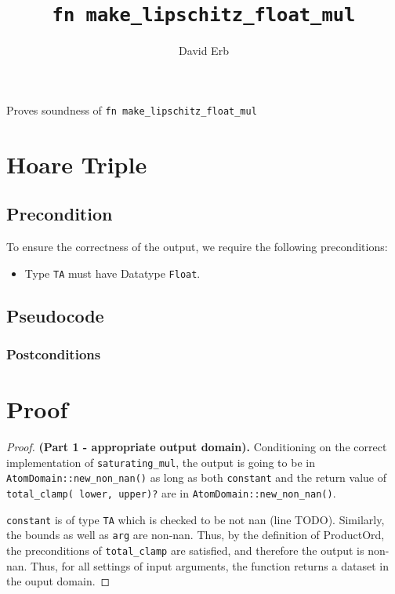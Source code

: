 \documentclass{article}
\title{\texttt{fn make\_lipschitz\_float\_mul}}
\author{David Erb}
\date{}
\begin{document}
\maketitle

Proves soundness of \texttt{fn make\_lipschitz\_float\_mul}


\section{Hoare Triple}
\subsection*{Precondition}
To ensure the correctness of the output, we require the following preconditions:

\begin{itemize}
    \item Type \texttt{TA} must have Datatype \texttt{Float}.
\end{itemize}

\subsection*{Pseudocode}


\subsubsection*{Postconditions}

\section{Proof}

\begin{proof}
    \textbf{(Part 1 - appropriate output domain).}
    Conditioning on the correct implementation of \texttt{saturating\_mul}, the output is going to be in \texttt{AtomDomain::new\_non\_nan()} as long as both \texttt{constant} and the return value of \texttt{total\_clamp( lower, upper)?} are in \texttt{AtomDomain::new\_non\_nan()}.
    
    \texttt{constant} is of type \texttt{TA} which is checked to be not nan (line TODO). Similarly, the bounds as well as \texttt{arg} are non-nan. Thus, by the definition of ProductOrd, the preconditions of \texttt{total\_clamp} are satisfied, and therefore the output is non-nan. Thus, for all settings of input arguments, the function returns a dataset in the ouput domain.
\end{proof}
\end{document}
